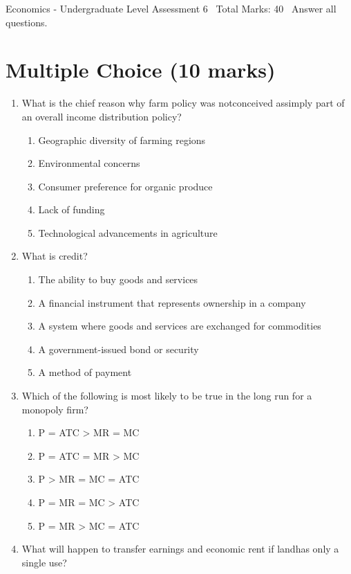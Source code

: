 \documentclass[12pt]{article}
\begin{document}
\begin{center}
Economics - Undergraduate Level Assessment 6 \
Total Marks: 40 \
Answer all questions.
\end{center}

\section*{Multiple Choice (10 marks)}
\begin{enumerate}[label=\arabic*.]
\item What is the chief reason why farm policy was notconceived assimply part of an overall income distribution policy?
\begin{enumerate}[label=(\alph*)]
    \item Geographic diversity of farming regions
    \item Environmental concerns
    \item Consumer preference for organic produce
    \item Lack of funding
    \item Technological advancements in agriculture
\end{enumerate}
\item What is credit?
\begin{enumerate}[label=(\alph*)]
    \item The ability to buy goods and services
    \item A financial instrument that represents ownership in a company
    \item A system where goods and services are exchanged for commodities
    \item A government-issued bond or security
    \item A method of payment
\end{enumerate}
\item Which of the following is most likely to be true in the long run for a monopoly firm?
\begin{enumerate}[label=(\alph*)]
    \item P = ATC \textgreater{} MR = MC
    \item P = ATC = MR \textgreater{} MC
    \item P \textgreater{} MR = MC = ATC
    \item P = MR = MC \textgreater{} ATC
    \item P = MR \textgreater{} MC = ATC
\end{enumerate}
\item What will happen to transfer earnings and economic rent if landhas only a single use?

\end{enumerate}
\end{document}

